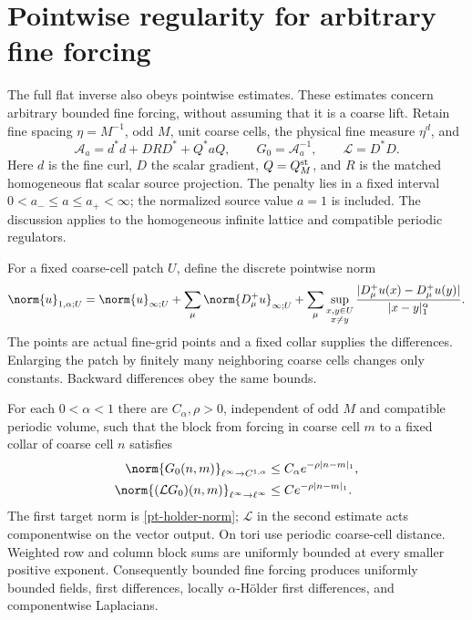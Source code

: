 \section{Pointwise regularity for arbitrary fine forcing}
\label{pt-section}

The full flat inverse also obeys pointwise estimates. These estimates
concern arbitrary bounded fine forcing, without assuming that it is a
coarse lift. Retain fine spacing $\eta=M^{-1}$, odd $M$, unit coarse
cells, the physical fine measure $\eta^d$, and
\begin{equation}\label{pt-operator}
 \mathcal A_a=d^*d+DRD^*+Q^*aQ,\qquad G_0=\mathcal A_a^{-1},
 \qquad \mathcal L=D^*D.
\end{equation}
Here $d$ is the fine curl, $D$ the scalar gradient, $Q=Q_M^{\rm st}$,
and $R$ is the matched homogeneous flat scalar source projection.
The penalty lies in a fixed interval $0<a_-\le a\le a_+<\infty$;
the normalized source value $a=1$ is included. The discussion applies
to the homogeneous infinite lattice and compatible periodic regulators.

For a fixed coarse-cell patch $U$, define the discrete pointwise norm
\begin{equation}\label{pt-holder-norm}
 \norm{u}_{1,\alpha;U}=\norm{u}_{\infty;U}
  +\sum_\mu\norm{D_\mu^+u}_{\infty;U}
  +\sum_\mu\sup_{\substack{x,y\in U\\x\ne y}}
       \frac{|D_\mu^+u(x)-D_\mu^+u(y)|}{|x-y|_1^\alpha}.
\end{equation}
The points are actual fine-grid points and a fixed collar supplies the
differences. Enlarging the patch by finitely many neighboring coarse
cells changes only constants. Backward differences obey the same bounds.

\begin{theorem}\label{pt-theorem}
For each $0<\alpha<1$ there are $C_\alpha,\rho>0$, independent of
odd $M$ and compatible periodic volume, such that the block from
forcing in coarse cell $m$ to a fixed collar of coarse cell $n$ satisfies
\begin{align}
 \norm{G_0(n,m)}_{\ell^\infty\to C^{1,\alpha}}
       &\le C_\alpha e^{-\rho|n-m|_1},
       \label{pt-pointwise-bound}\\
 \norm{(\mathcal L G_0)(n,m)}_{\ell^\infty\to\ell^\infty}
       &\le C e^{-\rho|n-m|_1}.
       \label{pt-laplacian-bound}
\end{align}
The first target norm is \eqref{pt-holder-norm}; $\mathcal L$ in
the second estimate acts componentwise on the vector output.
On tori use periodic coarse-cell distance. Weighted row and column
block sums are uniformly bounded at every smaller positive exponent.
Consequently bounded fine forcing produces uniformly bounded fields,
first differences, locally $\alpha$-H\"older first differences, and
componentwise Laplacians.
\end{theorem}

